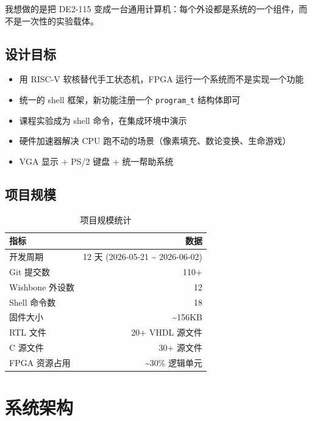 \documentclass{SYSUReport}
\begin{document}
我想做的是把 DE2-115 变成一台通用计算机：每个外设都是系统的一个组件，而不是一次性的实验载体。

\subsection{设计目标}

\begin{itemize}
    \item 用 RISC-V 软核替代手工状态机，FPGA 运行一个系统而不是实现一个功能
    \item 统一的 shell 框架，新功能注册一个 \texttt{program\_t} 结构体即可
    \item 课程实验成为 shell 命令，在集成环境中演示
    \item 硬件加速器解决 CPU 跑不动的场景（像素填充、数论变换、生命游戏）
    \item VGA 显示 + PS/2 键盘 + 统一帮助系统
\end{itemize}

\subsection{项目规模}

\begin{table}[!htbp]
    \centering
    \begin{tabular}{l|r}
        \hline
        \textbf{指标} & \textbf{数据} \\
        \hline
        开发周期 & 12 天 (2026-05-21 \textasciitilde{} 2026-06-02) \\
        Git 提交数 & 110+ \\
        Wishbone 外设数 & 12 \\
        Shell 命令数 & 18 \\
        固件大小 & \textasciitilde156KB \\
        RTL 文件 & 20+ VHDL 源文件 \\
        C 源文件 & 30+ 源文件 \\
        FPGA 资源占用 & \textasciitilde{}30\% 逻辑单元 \\
        \hline
    \end{tabular}
    \caption{项目规模统计}
\end{table}

\section{系统架构}
\end{document}
